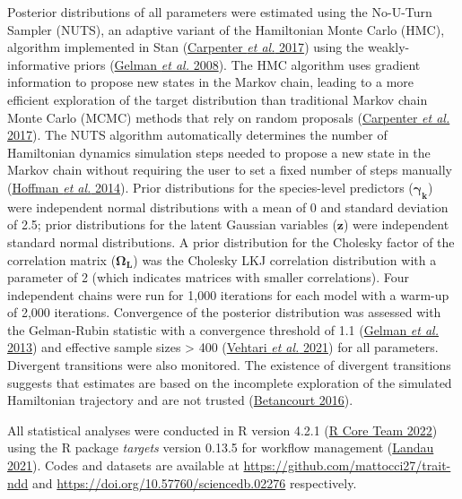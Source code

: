 \documentclass[
  12pt,
  letterpaper,
  DIV=11,
  numbers=noendperiod]{scrartcl}
\begin{document}
Posterior distributions of all parameters were estimated using the
No-U-Turn Sampler (NUTS), an adaptive variant of the Hamiltonian Monte
Carlo (HMC), algorithm implemented in Stan
(\protect\hyperlink{ref-Carpenter2017}{Carpenter \emph{et al.} 2017})
using the weakly-informative priors
(\protect\hyperlink{ref-Gelman2008}{Gelman \emph{et al.} 2008}). The HMC
algorithm uses gradient information to propose new states in the Markov
chain, leading to a more efficient exploration of the target
distribution than traditional Markov chain Monte Carlo (MCMC) methods
that rely on random proposals
(\protect\hyperlink{ref-Carpenter2017}{Carpenter \emph{et al.} 2017}).
The NUTS algorithm automatically determines the number of Hamiltonian
dynamics simulation steps needed to propose a new state in the Markov
chain without requiring the user to set a fixed number of steps manually
(\protect\hyperlink{ref-Hoffman2014}{Hoffman \emph{et al.} 2014}). Prior
distributions for the species-level predictors
(\(\boldsymbol{\gamma_k}\)) were independent normal distributions with a
mean of 0 and standard deviation of 2.5; prior distributions for the
latent Gaussian variables (\(\boldsymbol{z}\)) were independent standard
normal distributions. A prior distribution for the Cholesky factor of
the correlation matrix (\(\boldsymbol{\Omega_L}\)) was the Cholesky LKJ
correlation distribution with a parameter of 2 (which indicates matrices
with smaller correlations). Four independent chains were run for 1,000
iterations for each model with a warm-up of 2,000 iterations.
Convergence of the posterior distribution was assessed with the
Gelman-Rubin statistic with a convergence threshold of 1.1
(\protect\hyperlink{ref-Gelman2013}{Gelman \emph{et al.} 2013}) and
effective sample sizes \textgreater{} 400
(\protect\hyperlink{ref-Vehtari2021}{Vehtari \emph{et al.} 2021}) for
all parameters. Divergent transitions were also monitored. The existence
of divergent transitions suggests that estimates are based on the
incomplete exploration of the simulated Hamiltonian trajectory and are
not trusted (\protect\hyperlink{ref-Betancourt2016}{Betancourt 2016}).

All statistical analyses were conducted in R version 4.2.1
(\protect\hyperlink{ref-RCoreTeam2022}{R Core Team 2022}) using the R
package \emph{targets} version 0.13.5 for workflow management
(\protect\hyperlink{ref-Landau2021}{Landau 2021}). Codes and datasets
are available at \url{https://github.com/mattocci27/trait-ndd} and
\url{https://doi.org/10.57760/sciencedb.02276} respectively.
\end{document}
